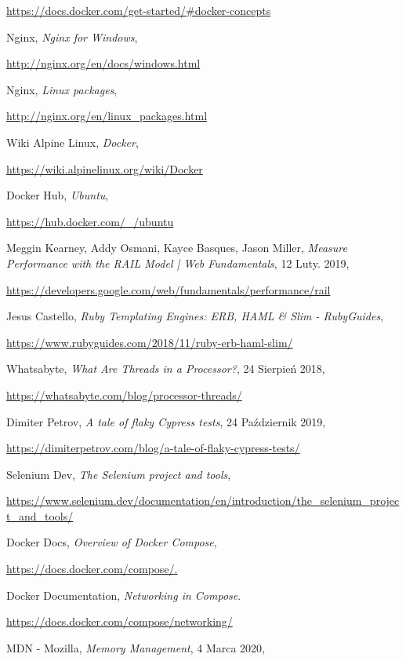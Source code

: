 \begin{thebibliography}{99}
\url{https://docs.docker.com/get-started/#docker-concepts}

Nginx,
\emph{Nginx for Windows},

\url{http://nginx.org/en/docs/windows.html}

Nginx, 
\emph{Linux packages},

\url{http://nginx.org/en/linux_packages.html}

Wiki Alpine Linux, 
\emph{Docker},

\url{https://wiki.alpinelinux.org/wiki/Docker}

Docker Hub,
\emph{Ubuntu},

\url{https://hub.docker.com/_/ubuntu}

Meggin Kearney, Addy Osmani, Kayce Basques, Jason Miller,
\emph{Measure Performance with the RAIL Model | Web Fundamentals},
12 Luty. 2019,

\url{https://developers.google.com/web/fundamentals/performance/rail}

Jesus Castello, 
\emph{Ruby Templating Engines: ERB, HAML \& Slim - RubyGuides},

\url{https://www.rubyguides.com/2018/11/ruby-erb-haml-slim/}

Whatsabyte,
\emph{What Are Threads in a Processor?},
24 Sierpień 2018,

\url{https://whatsabyte.com/blog/processor-threads/}

Dimiter Petrov,
\emph{A tale of flaky Cypress tests},
24 Październik 2019,

\url{https://dimiterpetrov.com/blog/a-tale-of-flaky-cypress-tests/}

Selenium Dev,
\emph{The Selenium project and tools},

\url{https://www.selenium.dev/documentation/en/introduction/the_selenium_project_and_tools/}

Docker Docs,
\emph{Overview of Docker Compose},

\url{https://docs.docker.com/compose/.}

Docker Documentation,
\emph{Networking in Compose}.

\url{https://docs.docker.com/compose/networking/}

MDN - Mozilla,
\emph{Memory Management},
4 Marca 2020,


\end{thebibliography}
